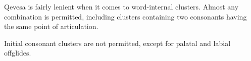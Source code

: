 \documentclass[grammar]{subfiles}
\begin{document}
  Qevesa is fairly lenient when it comes to word-internal clusters.  Almost any
  combination is permitted, including clusters containing two consonants having
  the same point of articulation. 


  Initial consonant clusters are not permitted, except for palatal and labial offglides.
\end{document}

